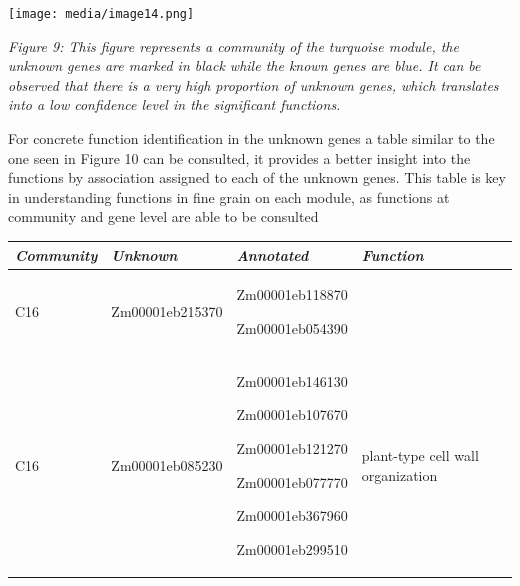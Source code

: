 \documentclass[
]{article}
\begin{document}
\texttt{[image: media/image14.png]}

\emph{Figure 9: This figure represents a community of the turquoise
module, the unknown genes are marked in black while the known genes are
blue. It can be observed that there is a very high proportion of unknown
genes, which translates into a low confidence level in the significant
functions.}

For concrete function identification in the unknown genes a table
similar to the one seen in Figure 10 can be consulted, it provides a
better insight into the functions by association assigned to each of the
unknown genes. This table is key in understanding functions in fine
grain on each module, as functions at community and gene level are able
to be consulted

\begin{longtable}[]{@{}llll@{}}
\toprule
\emph{Community} & \emph{Unknown} & \emph{Annotated} &
\emph{Function}\tabularnewline
\midrule
\endhead
\begin{minipage}[t]{0.22\columnwidth}\raggedright
C16\strut
\end{minipage} & \begin{minipage}[t]{0.22\columnwidth}\raggedright
Zm00001eb215370\strut
\end{minipage} & \begin{minipage}[t]{0.22\columnwidth}\raggedright
Zm00001eb118870

Zm00001eb054390\strut
\end{minipage} & \begin{minipage}[t]{0.22\columnwidth}\raggedright
\strut
\end{minipage}\tabularnewline
\begin{minipage}[t]{0.22\columnwidth}\raggedright
C16\strut
\end{minipage} & \begin{minipage}[t]{0.22\columnwidth}\raggedright
Zm00001eb085230\strut
\end{minipage} & \begin{minipage}[t]{0.22\columnwidth}\raggedright
Zm00001eb146130

Zm00001eb107670

Zm00001eb121270

Zm00001eb077770

Zm00001eb367960

Zm00001eb299510\strut
\end{minipage} & \begin{minipage}[t]{0.22\columnwidth}\raggedright
plant-type cell wall organization


\end{minipage}
\end{longtable}
\end{document}
